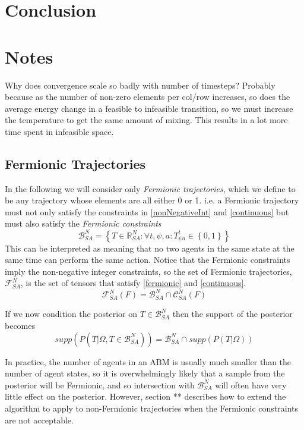 \documentclass{article}
\begin{document}
\section{Conclusion}

\section{Notes}

Why does convergence scale so badly with number of timesteps? Probably because as the number of non-zero elements per col/row increases, so does the average energy change in a feasible to infeasible transition, so we must increase the temperature to get the same amount of mixing. This results in a lot more time spent in infeasible space. 

\subsection{Fermionic Trajectories}

In the following we will consider only \textit{Fermionic trajectories}, which we define to be any trajectory whose elements are all either 0 or 1. i.e. a Fermionic trajectory must not only satisfy the constraints in \eqref{nonNegativeInt} and \eqref{continuous} but must also satisfy the \textit{Fermionic constraints}
\begin{equation}
\mathcal{B}^N_{SA} = \left\{T\in\mathbb{R}^N_{SA} : \forall t,\psi,a: T^t_{\psi a} \in \left\{ 0,1 \right\}\right\}
\label{fermionic}
\end{equation}
This can be interpreted as meaning that no two agents in the same state at the same time can perform the same action. Notice that the Fermionic constraints imply the non-negative integer constraints, so the set of Fermionic trajectories, $\mathcal{F}^N_{SA}$, is the set of tensors that satisfy \eqref{fermionic} and \eqref{continuous}.
\begin{equation}
\mathcal{F}^N_{SA}(F) = \mathcal{B}^N_{SA} \cap \mathcal{C}^N_{SA}(F)
\end{equation}

If we now condition the posterior on $T \in \mathcal{B}^N_{SA}$ then the support of the posterior becomes
\begin{equation}
supp(P(T|\Omega, T\in\mathcal{B}^N_{SA})) = \mathcal{B}^N_{SA} \cap supp(P(T|\Omega))
\label{fermionicSupport1}
\end{equation}

In practice, the number of agents in an ABM is usually much smaller than the number of agent states, so it is overwhelmingly likely that a sample from the posterior will be Fermionic, and so intersection with $\mathcal{B}^N_{SA}$ will often have very little effect on the posterior. However, section ** describes how to extend the algorithm to apply to non-Fermionic trajectories when the Fermionic constraints are not acceptable.
\end{document}

